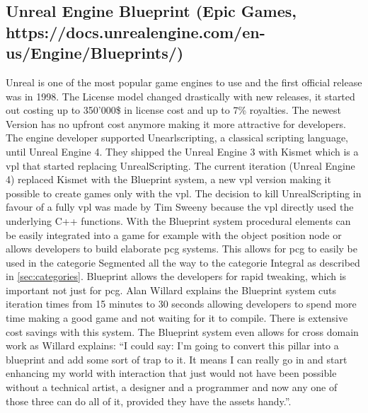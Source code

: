 \documentclass[10pt,a4paper]{article}
\begin{document}
\begin{multicols}{2}
\subsection{Unreal Engine Blueprint (Epic Games, https://docs.unrealengine.com/en-us/Engine/Blueprints/)}
Unreal is one of the most popular game engines to use and the first official release was in 1998. The License model changed drastically with new releases, it started out costing up to 350’000\$ in license cost and up to 7\% royalties\cite{Herz1999}. The newest Version has no upfront cost anymore making it more attractive for developers. The engine developer supported Unearlscripting, a classical scripting language, until Unreal Engine 4. They shipped the Unreal Engine 3 with Kismet which is a \gls{vpl} that started replacing UnrealScripting. The current iteration (Unreal Engine 4) replaced Kismet with the Blueprint system, a new \gls{vpl} version making it possible to create games only with the \gls{vpl}. The decision to kill UnrealScripting in favour of a fully \gls{vpl} was made by Tim Sweeny because the \gls{vpl} directly used the underlying C++ functions\cite{Wawro2017}. With the Blueprint system procedural elements can be easily integrated into a game for example with the object position node or allows developers to build elaborate \gls{pcg} systems. This allows for \gls{pcg} to easily be used in the categorie Segmented all the way to the categorie Integral as described in \autoref{sec:categories}. Blueprint allows the developers for rapid tweaking, which is important not just for \gls{pcg}. Alan Willard explains the Blueprint system cuts iteration times from 15 minutes to 30 seconds allowing developers to spend more time making a good game and not waiting for it to compile\cite{Totilo2012}. There is extensive cost savings with this system. The Blueprint system even allows for cross domain work as Willard explains: “I could say: I’m going to convert this pillar into a blueprint and add some sort of trap to it. It means I can really go in and start enhancing my world with interaction that just would not have been possible without a technical artist, a designer and a programmer and now any one of those three can do all of it, provided they have the assets handy.”\cite{Totilo2012}.

\end{multicols}
\end{document}
